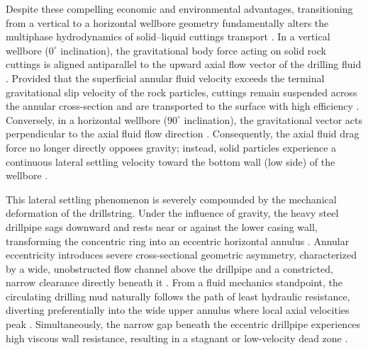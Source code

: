 Despite these compelling economic and environmental advantages, transitioning from a vertical to a horizontal wellbore geometry fundamentally alters the multiphase hydrodynamics of solid--liquid cuttings transport \citep{Khaled2020, Hajipour2020, Li2026}. In a vertical wellbore ($0^\circ$ inclination), the gravitational body force acting on solid rock cuttings is aligned antiparallel to the upward axial flow vector of the drilling fluid \citep{Hajipour2020}. Provided that the superficial annular fluid velocity exceeds the terminal gravitational slip velocity of the rock particles, cuttings remain suspended across the annular cross-section and are transported to the surface with high efficiency \citep{Khaled2020}. Conversely, in a horizontal wellbore ($90^\circ$ inclination), the gravitational vector acts perpendicular to the axial fluid flow direction \citep{Hajipour2020, Li2026}. Consequently, the axial fluid drag force no longer directly opposes gravity; instead, solid particles experience a continuous lateral settling velocity toward the bottom wall (low side) of the wellbore \citep{Osgouei2010, Shehab2015}.

This lateral settling phenomenon is severely compounded by the mechanical deformation of the drillstring. Under the influence of gravity, the heavy steel drillpipe sags downward and rests near or against the lower casing wall, transforming the concentric ring into an eccentric horizontal annulus \citep{Sorgun2010, Shehab2015, Saad2024}. Annular eccentricity introduces severe cross-sectional geometric asymmetry, characterized by a wide, unobstructed flow channel above the drillpipe and a constricted, narrow clearance directly beneath it \citep{Khaled2020, Li2026}. From a fluid mechanics standpoint, the circulating drilling mud naturally follows the path of least hydraulic resistance, diverting preferentially into the wide upper annulus where local axial velocities peak \citep{Shehab2015, Hajipour2020}. Simultaneously, the narrow gap beneath the eccentric drillpipe experiences high viscous wall resistance, resulting in a stagnant or low-velocity dead zone \citep{Shehab2015, Osgouei2010}. 

